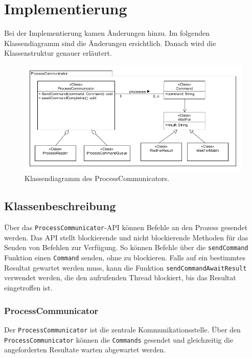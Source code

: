 \section{Implementierung}

Bei der Implementierung kamen Änderungen hinzu. Im folgenden Klassendiagramm sind die Änderungen ersichtlich. Danach wird die Klassenstruktur genauer erläutert.

\begin{figure}

	\centering
		\includegraphics[scale=0.75]{forthcommunication/communicator.png}
		\caption{Klassendiagramm des ProcessCommunicators.}
		\label{fig:communicator}

\end{figure}

\newpage

\subsection{Klassenbeschreibung}

Über das \verb!ProcessCommunicator!-API können Befehle an den Prozess gesendet werden. Das API stellt blockierende und nicht blockierende Methoden für das Senden von Befehlen zur Verfügung. So können Befehle über die \verb!sendCommand! Funktion einen \verb!Command! senden, ohne zu blockieren. Falls auf ein bestimmtes Resultat gewartet werden muss, kann die Funktion \verb!sendCommandAwaitResult! verwendet werden, die den aufrufenden Thread blockiert, bis das Resultat eingetroffen ist. 

\subsubsection{ProcessCommunicator}

Der \verb!ProcessCommunicator! ist die zentrale Kommunikationsstelle. Über den \\ \verb!ProcessCommunicator! können die \verb!Commands! gesendet und gleichzeitig die angeforderten Resultate warten abgewartet werden.

